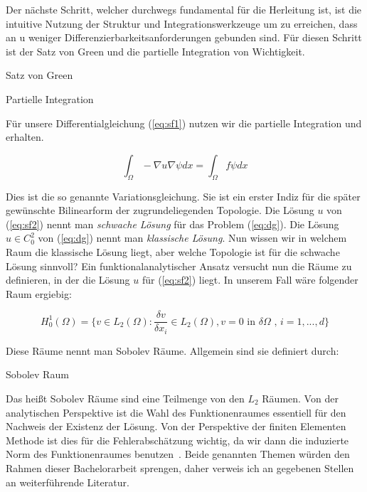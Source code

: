 Der nächste Schritt, welcher durchwegs fundamental für die Herleitung ist, ist die intuitive Nutzung der Struktur und Integrationswerkzeuge um zu erreichen, dass an u weniger Differenzierbarkeitsanforderungen gebunden sind. Für diesen Schritt ist der Satz von Green und die partielle Integration von Wichtigkeit.

\begin{Lemma} Satz von Green
\end{Lemma}

\begin{Lemma} Partielle Integration
\end{Lemma}

Für unsere Differentialgleichung (\ref{eq:sf1}) nutzen wir die partielle Integration und erhalten.

\begin{equation} \label{eq:sf2}
\int_{\Omega} - \nabla u \nabla \psi dx = \int_{\Omega} f \psi dx
\end{equation}
  
Dies ist die so genannte Variationsgleichung. Sie ist ein erster Indiz für die später gewünschte Bilinearform der zugrundeliegenden Topologie.
Die Lösung $u$ von (\ref{eq:sf2}) nennt man \textit{schwache Lösung} für das Problem (\ref{eq:dg}).
Die Lösung $u \in C_{0}^{2}$ von (\ref{eq:dg}) nennt man \textit{klassische Lösung}. Nun wissen wir in welchem Raum die klassische Lösung liegt, aber welche Topologie ist für die schwache Lösung sinnvoll? 
Ein funktionalanalytischer Ansatz versucht nun die Räume zu definieren, in der die Lösung $u$ für (\ref{eq:sf2}) liegt. In unserem Fall wäre folgender Raum ergiebig:

\begin{equation*}
	H_{0}^{1}(\Omega) = \{ v \in L_{2}(\Omega) : \dfrac{\delta v}{\delta x_{i}} \in L_{2}(\Omega), v=0 \text{ in } \delta \Omega \text{ , } i=1,...,d \}
\end{equation*}

Diese Räume nennt man Sobolev Räume. Allgemein sind sie definiert durch:

\begin{Definition} Sobolev Raum
\end{Definition}

Das heißt Sobolev Räume sind eine Teilmenge von den $L_{2}$ Räumen.
Von der analytischen Perspektive ist die Wahl des Funktionenraumes essentiell für den Nachweis der Existenz der Lösung. Von der Perspektive der finiten Elementen Methode ist dies für die Fehlerabschätzung wichtig, da wir dann die induzierte Norm des Funktionenraumes benutzen~\cite[36]{Johnson}. Beide genannten Themen würden den Rahmen dieser Bachelorarbeit sprengen, daher verweis ich an gegebenen Stellen an weiterführende Literatur.

